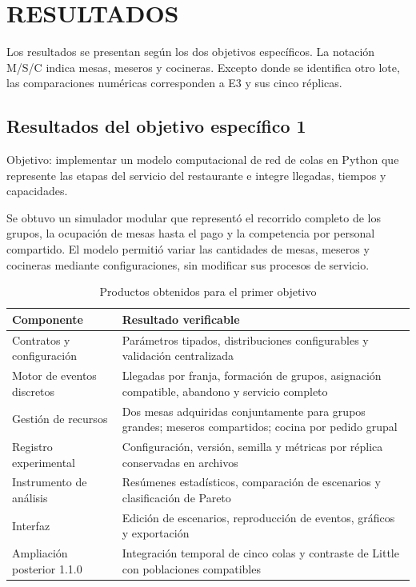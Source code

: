 \documentclass[10pt,a4paper,twocolumn]{article}
\begin{document}
\section{RESULTADOS}

Los resultados se presentan según los dos objetivos específicos. La notación M/S/C indica mesas, meseros y cocineras. Excepto donde se identifica otro lote, las comparaciones numéricas corresponden a E3 y sus cinco réplicas.

\subsection{Resultados del objetivo específico 1}

Objetivo: implementar un modelo computacional de red de colas en Python que represente las etapas del servicio del restaurante e integre llegadas, tiempos y capacidades.

Se obtuvo un simulador modular que representó el recorrido completo de los grupos, la ocupación de mesas hasta el pago y la competencia por personal compartido. El modelo permitió variar las cantidades de mesas, meseros y cocineras mediante configuraciones, sin modificar sus procesos de servicio.

\begin{table}[!tb]\centering\small
\caption{Productos obtenidos para el primer objetivo}
\label{tab:5}
\setlength{\tabcolsep}{4pt}
\renewcommand{\arraystretch}{1.18}
\begin{tabularx}{\textwidth}{YY}
\toprule
\textbf{Componente} & \textbf{Resultado verificable} \\
\midrule
Contratos y configuración & Parámetros tipados, distribuciones configurables y validación centralizada \\
Motor de eventos discretos & Llegadas por franja, formación de grupos, asignación compatible, abandono y servicio completo \\
Gestión de recursos & Dos mesas adquiridas conjuntamente para grupos grandes; meseros compartidos; cocina por pedido grupal \\
Registro experimental & Configuración, versión, semilla y métricas por réplica conservadas en archivos \\
Instrumento de análisis & Resúmenes estadísticos, comparación de escenarios y clasificación de Pareto \\
Interfaz & Edición de escenarios, reproducción de eventos, gráficos y exportación \\
Ampliación posterior 1.1.0 & Integración temporal de cinco colas y contraste de Little con poblaciones compatibles \\
\bottomrule\end{tabularx}\end{table}
\end{document}
